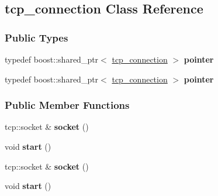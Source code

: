 \hypertarget{classtcp__connection}{
\subsection{tcp\_\-connection Class Reference}
\label{classtcp__connection}
}
\subsubsection*{Public Types}
\begin{DoxyCompactItemize}
\item 
\hypertarget{classtcp__connection_af65a4d4a0e58102041dd699d15a4b338}{
typedef boost::shared\_\-ptr$<$ \hyperlink{classtcp__connection}{tcp\_\-connection} $>$ {\bfseries pointer}}
\label{classtcp__connection_af65a4d4a0e58102041dd699d15a4b338}

\item 
\hypertarget{classtcp__connection_af65a4d4a0e58102041dd699d15a4b338}{
typedef boost::shared\_\-ptr$<$ \hyperlink{classtcp__connection}{tcp\_\-connection} $>$ {\bfseries pointer}}
\label{classtcp__connection_af65a4d4a0e58102041dd699d15a4b338}

\end{DoxyCompactItemize}
\subsubsection*{Public Member Functions}
\begin{DoxyCompactItemize}
\item 
\hypertarget{classtcp__connection_a173b742721cd58a017cac3d55007b973}{
tcp::socket \& {\bfseries socket} ()}
\label{classtcp__connection_a173b742721cd58a017cac3d55007b973}

\item 
\hypertarget{classtcp__connection_a2a1967f305a797f7af974cdc7d49a283}{
void {\bfseries start} ()}
\label{classtcp__connection_a2a1967f305a797f7af974cdc7d49a283}

\item 
\hypertarget{classtcp__connection_a173b742721cd58a017cac3d55007b973}{
tcp::socket \& {\bfseries socket} ()}
\label{classtcp__connection_a173b742721cd58a017cac3d55007b973}

\item 
\hypertarget{classtcp__connection_a2a1967f305a797f7af974cdc7d49a283}{
void {\bfseries start} ()}
\label{classtcp__connection_a2a1967f305a797f7af974cdc7d49a283}

\end{DoxyCompactItemize}
